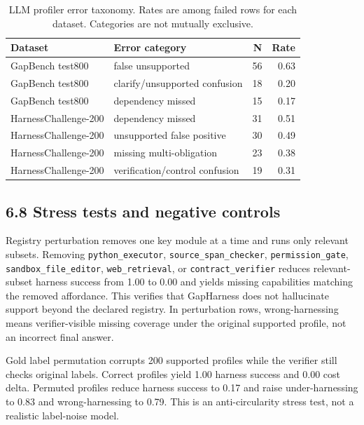 \documentclass[
  10pt,
]{article}
\begin{document}
\begin{table}[H]
\centering
\scriptsize
\caption{LLM profiler error taxonomy. Rates are among failed rows for each dataset. Categories are not mutually exclusive.}
\label{tab:error-taxonomy}
\begin{tabular}{llrr}
\toprule
Dataset & Error category & N & Rate\\
\midrule
GapBench test800 & false unsupported & 56 & 0.63\\
GapBench test800 & clarify/unsupported confusion & 18 & 0.20\\
GapBench test800 & dependency missed & 15 & 0.17\\
HarnessChallenge-200 & dependency missed & 31 & 0.51\\
HarnessChallenge-200 & unsupported false positive & 30 & 0.49\\
HarnessChallenge-200 & missing multi-obligation & 23 & 0.38\\
HarnessChallenge-200 & verification/control confusion & 19 & 0.31\\
\bottomrule
\end{tabular}
\end{table}

\subsection{6.8 Stress tests and negative
controls}\label{stress-tests-and-negative-controls}

Registry perturbation removes one key module at a time and runs only
relevant subsets. Removing \texttt{python\_executor},
\texttt{source\_span\_checker}, \texttt{permission\_gate},
\texttt{sandbox\_file\_editor}, \texttt{web\_retrieval}, or
\texttt{contract\_verifier} reduces relevant-subset harness success from
1.00 to 0.00 and yields missing capabilities matching the removed
affordance. This verifies that GapHarness does not hallucinate support
beyond the declared registry. In perturbation rows, wrong-harnessing
means verifier-visible missing coverage under the original supported
profile, not an incorrect final answer.

Gold label permutation corrupts 200 supported profiles while the
verifier still checks original labels. Correct profiles yield 1.00
harness success and 0.00 cost delta. Permuted profiles reduce harness
success to 0.17 and raise under-harnessing to 0.83 and wrong-harnessing
to 0.79. This is an anti-circularity stress test, not a realistic
label-noise model.
\end{document}
